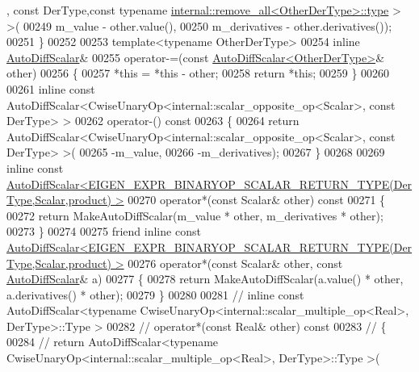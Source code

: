 \begin{DoxyCode}
      , \textcolor{keyword}{const} DerType,\textcolor{keyword}{const} \textcolor{keyword}{typename} \hyperlink{group___sparse_core___module}{internal::remove\_all<OtherDerType>::type}
      > >(
00249         m\_value - other.value(),
00250         m\_derivatives - other.derivatives());
00251     \}
00252 
00253     \textcolor{keyword}{template}<\textcolor{keyword}{typename} OtherDerType>
00254     \textcolor{keyword}{inline} \hyperlink{class_eigen_1_1_auto_diff_scalar}{AutoDiffScalar}&
00255     operator-=(\textcolor{keyword}{const} \hyperlink{class_eigen_1_1_auto_diff_scalar}{AutoDiffScalar<OtherDerType>}& other)
00256     \{
00257       *\textcolor{keyword}{this} = *\textcolor{keyword}{this} - other;
00258       \textcolor{keywordflow}{return} *\textcolor{keyword}{this};
00259     \}
00260 
00261     \textcolor{keyword}{inline} \textcolor{keyword}{const} AutoDiffScalar<CwiseUnaryOp<internal::scalar\_opposite\_op<Scalar>, \textcolor{keyword}{const} DerType> >
00262     operator-()\textcolor{keyword}{ const}
00263 \textcolor{keyword}{    }\{
00264       \textcolor{keywordflow}{return} AutoDiffScalar<CwiseUnaryOp<internal::scalar\_opposite\_op<Scalar>, \textcolor{keyword}{const} DerType> >(
00265         -m\_value,
00266         -m\_derivatives);
00267     \}
00268 
00269     \textcolor{keyword}{inline} \textcolor{keyword}{const} 
      \hyperlink{class_eigen_1_1_auto_diff_scalar}{AutoDiffScalar<EIGEN\_EXPR\_BINARYOP\_SCALAR\_RETURN\_TYPE(DerType,Scalar,product) >}
00270     operator*(\textcolor{keyword}{const} Scalar& other)\textcolor{keyword}{ const}
00271 \textcolor{keyword}{    }\{
00272       \textcolor{keywordflow}{return} MakeAutoDiffScalar(m\_value * other, m\_derivatives * other);
00273     \}
00274 
00275     \textcolor{keyword}{friend} \textcolor{keyword}{inline} \textcolor{keyword}{const} 
      \hyperlink{class_eigen_1_1_auto_diff_scalar}{AutoDiffScalar<EIGEN\_EXPR\_BINARYOP\_SCALAR\_RETURN\_TYPE(DerType,Scalar,product) >}
00276     operator*(\textcolor{keyword}{const} Scalar& other, \textcolor{keyword}{const} \hyperlink{class_eigen_1_1_auto_diff_scalar}{AutoDiffScalar}& a)
00277     \{
00278       \textcolor{keywordflow}{return} MakeAutoDiffScalar(a.value() * other, a.derivatives() * other);
00279     \}
00280 
00281 \textcolor{comment}{//     inline const AutoDiffScalar<typename CwiseUnaryOp<internal::scalar\_multiple\_op<Real>, DerType>::Type
       >}
00282 \textcolor{comment}{//     operator*(const Real& other) const}
00283 \textcolor{comment}{//     \{}
00284 \textcolor{comment}{//       return AutoDiffScalar<typename CwiseUnaryOp<internal::scalar\_multiple\_op<Real>, DerType>::Type >(}

\end{DoxyCode}
